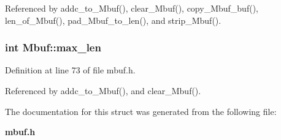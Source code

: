 Referenced by addc\_\-to\_\-Mbuf(), clear\_\-Mbuf(), copy\_\-Mbuf\_\-buf(), len\_\-of\_\-Mbuf(), pad\_\-Mbuf\_\-to\_\-len(), and strip\_\-Mbuf().
\subsubsection{\setlength{\rightskip}{0pt plus 5cm}int \bf{Mbuf::max\_\-len}}\label{structMbuf_1981b512a84c0ad15536fbcb83760b39}




Definition at line 73 of file mbuf.h.

Referenced by addc\_\-to\_\-Mbuf(), and clear\_\-Mbuf().

The documentation for this struct was generated from the following file:\begin{CompactItemize}
\item 
\bf{mbuf.h}\end{CompactItemize}
